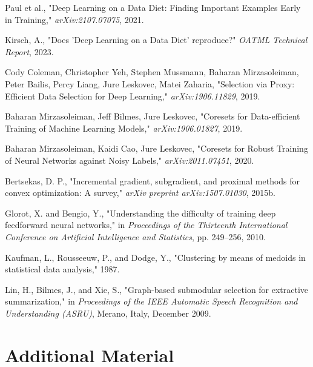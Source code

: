 \documentclass{article}
\begin{document}
\begin{thebibliography}{9}

Paul et al., "Deep Learning on a Data Diet: Finding Important Examples Early in Training," \textit{arXiv:2107.07075}, 2021.

Kirsch, A., "Does 'Deep Learning on a Data Diet' reproduce?" \textit{OATML Technical Report}, 2023.

Cody Coleman, Christopher Yeh, Stephen Mussmann, Baharan Mirzasoleiman, Peter Bailis, Percy Liang, Jure Leskovec, Matei Zaharia, "Selection via Proxy: Efficient Data Selection for Deep Learning," \textit{arXiv:1906.11829}, 2019.

Baharan Mirzasoleiman, Jeff Bilmes, Jure Leskovec, "Coresets for Data-efficient Training of Machine Learning Models," \textit{arXiv:1906.01827}, 2019.

Baharan Mirzasoleiman, Kaidi Cao, Jure Leskovec, "Coresets for Robust Training of Neural Networks against Noisy Labels," \textit{arXiv:2011.07451}, 2020.

Bertsekas, D. P., "Incremental gradient, subgradient, and proximal methods for convex optimization: A survey," \textit{arXiv preprint arXiv:1507.01030}, 2015b.

Glorot, X. and Bengio, Y., "Understanding the difficulty of training deep feedforward neural networks," in \textit{Proceedings of the Thirteenth International Conference on Artificial Intelligence and Statistics}, pp. 249–256, 2010.

Kaufman, L., Rousseeuw, P., and Dodge, Y., "Clustering by means of medoids in statistical data analysis," 1987.

Lin, H., Bilmes, J., and Xie, S., "Graph-based submodular selection for extractive summarization," in \textit{Proceedings of the IEEE Automatic Speech Recognition and Understanding (ASRU)}, Merano, Italy, December 2009.

\end{thebibliography}


\appendix
\section{Additional Material}
\end{document}
